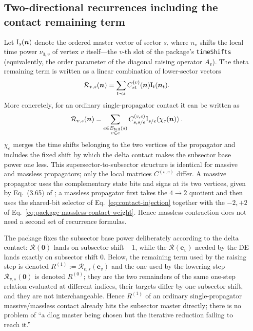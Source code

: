 \documentclass[11pt,a4paper]{article}
\newcommand{\cR}{\mathcal R}
\begin{document}
\subsection{Two-directional recurrences including the contact remaining term}

Let $\bm{\text I}_s(\bm n)$ denote the ordered master vector of sector $s$, where $n_v$ shifts the local time power $\nu_{0,v}$ of vertex $v$ itself---the $v$-th slot of the package's \texttt{timeShifts} (equivalently, the order parameter of the diagonal raising operator $A_v$). The theta remaining term is written as a linear combination of lower-sector vectors
\begin{equation}
 \cR_{v,s}(\bm n)
 =\sum_{t\prec s}C_{st}^{(v)}(\bm n)\bm{\text I}_t(\bm n_t).
 \label{eq:R-as-CF}
\end{equation}
More concretely, for an ordinary single-propagator contact it can be written as
\begin{equation}
 \cR_{v,s}(\bm n)
 =\sum_{\substack{e\in E_{\rm full}(s)\\v\in e}}
 C_{s,s/e}^{(v,e)}
 \bm{\text I}_{s/e}\!\left(\chi_e(\bm n)\right).
 \label{eq:R-edge-sum}
\end{equation}
$\chi_e$ merges the time shifts belonging to the two vertices of the propagator and includes the fixed shift by which the delta contact makes the subsector base power one less. This supersector-to-subsector structure is identical for massive and massless propagators; only the local matrices $C^{(v,e)}$ differ. A massive propagator uses the complementary state bits and signs at its two vertices, given by Eq.~(3.65) of \cite{Chen:2023eic}; a massless propagator first takes the $4\to2$ quotient and then uses the shared-bit selector of Eq.~\eqref{eq:contact-injection} together with the $-2,+2$ of Eq.~\eqref{eq:package-massless-contact-weight}. Hence massless contraction does not need a second set of recurrence formulas.

The package fixes the subsector base power deliberately according to the delta contact: $\cR(\bm0)$ lands on subsector shift $-1$, while the $\cR(\bm e_v)$ needed by the DE lands exactly on subsector shift $0$. Below, the remaining term used by the raising step is denoted $R^{(1)}:=\cR_{v,s}(\bm e_v)$ and the one used by the lowering step $\cR_{v,s}(\bm0)$ is denoted $R^{(0)}$; they are the two remainders of the same one-step relation evaluated at different indices, their targets differ by one subsector shift, and they are not interchangeable. Hence $R^{(1)}$ of an ordinary single-propagator massive/massless contact already hits the subsector master directly; there is no problem of ``a dlog master being chosen but the iterative reduction failing to reach it.''
\end{document}
